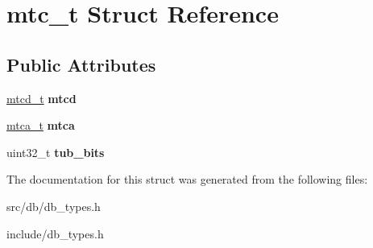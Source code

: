 \hypertarget{structmtc__t}{
\section{mtc\_\-t Struct Reference}
\label{structmtc__t}
}
\subsection*{Public Attributes}
\begin{DoxyCompactItemize}
\item 
\hypertarget{structmtc__t_a826c909339743dbbfa122544f991b45a}{
\hyperlink{structmtcd__t}{mtcd\_\-t} {\bfseries mtcd}}
\label{structmtc__t_a826c909339743dbbfa122544f991b45a}

\item 
\hypertarget{structmtc__t_ac3af5c6d7034cc18427fc6fa7158e5f6}{
\hyperlink{structmtca__t}{mtca\_\-t} {\bfseries mtca}}
\label{structmtc__t_ac3af5c6d7034cc18427fc6fa7158e5f6}

\item 
\hypertarget{structmtc__t_a5ba7bdc4fcc73eea8c28966a9de930a2}{
uint32\_\-t {\bfseries tub\_\-bits}}
\label{structmtc__t_a5ba7bdc4fcc73eea8c28966a9de930a2}

\end{DoxyCompactItemize}


The documentation for this struct was generated from the following files:\begin{DoxyCompactItemize}
\item 
src/db/db\_\-types.h\item 
include/db\_\-types.h\end{DoxyCompactItemize}
